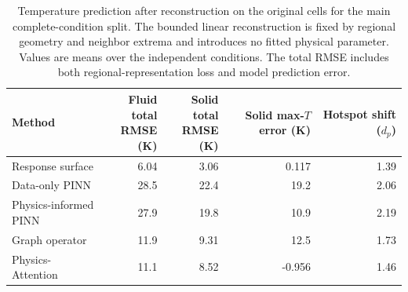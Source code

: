 \begin{table}[htbp]
\centering
\small
\caption{Temperature prediction after reconstruction on the original \OpenFOAM{} cells for the main complete-condition split. The bounded linear reconstruction is fixed by regional geometry and neighbor extrema and introduces no fitted physical parameter. Values are means over the independent conditions. The total RMSE includes both regional-representation loss and model prediction error.}
\label{tab:native_cell_prediction}
\begin{tabular*}{\textwidth}{@{\extracolsep{\fill}}lrrrr@{}}
\toprule
Method & \shortstack{Fluid total\\RMSE (K)} & \shortstack{Solid total\\RMSE (K)} & \shortstack{Solid max-$T$\\error (K)} & \shortstack{Hotspot shift\\($d_p$)} \\
\midrule
Response surface & 6.04 & 3.06 & 0.117 & 1.39 \\
Data-only PINN & 28.5 & 22.4 & 19.2 & 2.06 \\
Physics-informed PINN & 27.9 & 19.8 & 10.9 & 2.19 \\
Graph operator & 11.9 & 9.31 & 12.5 & 1.73 \\
Physics-Attention & 11.1 & 8.52 & -0.956 & 1.46 \\
\bottomrule
\end{tabular*}
\end{table}
